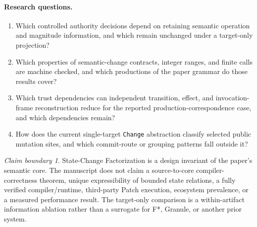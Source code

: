 \documentclass[10pt]{article}
\theoremstyle{plain}
\theoremstyle{remark}
\newtheorem*{claimboundary}{Claim boundary}
\begin{document}
\paragraph{Research questions.}
\begin{enumerate}[leftmargin=*]
\item[\textbf{RQ1}] Which controlled authority decisions depend on retaining semantic operation and magnitude information, and which remain unchanged under a target-only projection?
\item[\textbf{RQ2}] Which properties of semantic-change contracts, integer ranges, and finite calls are machine checked, and which productions of the paper grammar do those results cover?
\item[\textbf{RQ3}] Which trust dependencies can independent transition, effect, and invocation-frame reconstruction reduce for the reported production-correspondence case, and which dependencies remain?
\item[\textbf{RQ4}] How does the current single-target \texttt{Change} abstraction classify selected public mutation sites, and which commit-route or grouping patterns fall outside it?
\end{enumerate}

\begin{claimboundary}
State-Change Factorization is a design invariant of the paper's semantic core. The manuscript does not claim a source-to-core compiler-correctness theorem, unique expressibility of bounded state relations, a fully verified compiler/runtime, third-party Patch execution, ecosystem prevalence, or a measured performance result. The target-only comparison is a within-artifact information ablation rather than a surrogate for F*, Granule, or another prior system.
\end{claimboundary}
\end{document}
